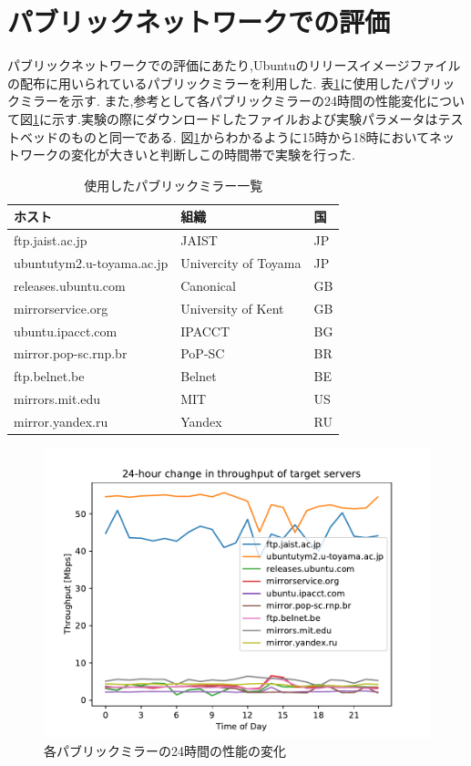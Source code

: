 \documentclass[a4j,12pt]{gradthesis_utf8}
\begin{document}
\section{パブリックネットワークでの評価}
\label{pub}
パブリックネットワークでの評価にあたり,Ubuntuのリリースイメージファイルの配布に用いられているパブリックミラーを利用した.
表\ref{tablemirror}に使用したパブリックミラーを示す.
また,参考として各パブリックミラーの24時間の性能変化について図\ref{24h}に示す.実験の際にダウンロードしたファイルおよび実験パラメータはテストベッドのものと同一である.
図\ref{24h}からわかるように15時から18時においてネットワークの変化が大きいと判断しこの時間帯で実験を行った.
\begin{table}[htb]
	\begin{center}
		\caption{使用したパブリックミラー一覧}
		\label{tablemirror}
		\begin{tabular}{|l|l|l|} \hline
			ホスト & 組織 & 国\\ \hline \hline
			ftp.jaist.ac.jp & JAIST & JP \\
			ubuntutym2.u-toyama.ac.jp & Univercity of Toyama & JP \\
			releases.ubuntu.com & Canonical & GB \\
			mirrorservice.org & University of Kent & GB \\
			ubuntu.ipacct.com & IPACCT & BG \\
			mirror.pop-sc.rnp.br & PoP-SC & BR \\
			ftp.belnet.be & Belnet & BE \\
			mirrors.mit.edu & MIT & US \\
			mirror.yandex.ru & Yandex & RU \\ \hline
		\end{tabular}
	\end{center}
\end{table}

\newpage

\begin{figure}[h]
    \begin{center}
        \includegraphics[width=15cm]{figure/thp24h.pdf}
        \caption{各パブリックミラーの24時間の性能の変化}
        \label{24h}
    \end{center}
\end{figure}
\end{document}
